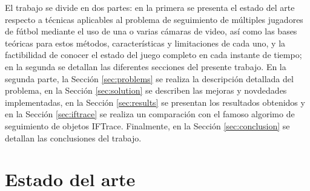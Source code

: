 \documentclass[a4paper,11pt]{report}
\begin{document}
El trabajo se divide en dos partes: en la primera se presenta el estado del arte respecto a
técnicas aplicables al problema de seguimiento de múltiples jugadores de fútbol
mediante el uso de una o varias cámaras de video, así como las bases teóricas
para estos métodos, características y limitaciones de cada uno, y la
factibilidad de conocer el estado del juego completo en cada instante de
tiempo; en la segunda se detallan las diferentes secciones
del presente trabajo. En la segunda parte, la Sección \ref{sec:problems} se realiza la descripción detallada del problema, en la Sección
\ref{sec:solution} se describen las mejoras y novdedades implementadas, en la Sección \ref{sec:results} se presentan los resultados obtenidos y en
la Sección \ref{sec:iftrace} se realiza un comparación con el famoso algorimo de seguimiento de objetos IFTrace. Finalmente, en la Sección
\ref{sec:conclusion} se detallan las conclusiones del trabajo.


\newpage

\chapter{Estado del arte}



\newpage











\printbibliography
\end{document}
